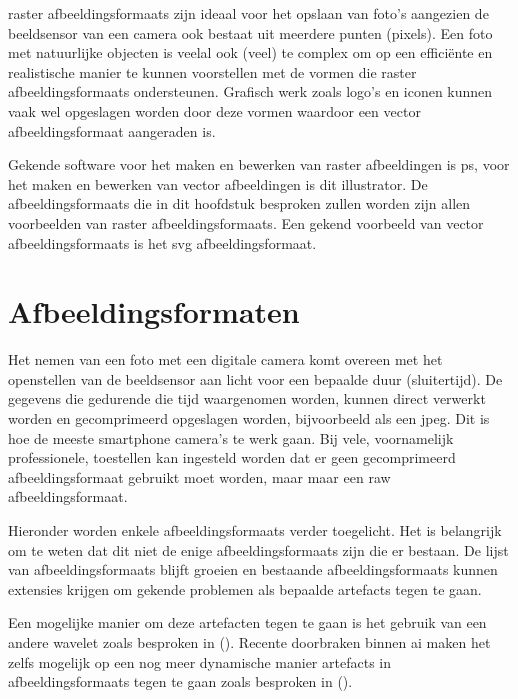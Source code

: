 \Gls{raster} \glspl{afbeeldingsformaat} zijn ideaal voor het opslaan van foto's aangezien de beeldsensor van een camera ook bestaat uit meerdere punten (pixels). Een foto met natuurlijke objecten is veelal ook (veel) te complex om op een efficiënte en realistische manier te kunnen voorstellen met de vormen die \gls{raster} \glspl{afbeeldingsformaat}  ondersteunen. Grafisch werk zoals logo's en iconen kunnen vaak wel opgeslagen worden door deze vormen waardoor een \gls{vector} \gls{afbeeldingsformaat} aangeraden is.

Gekende software voor het maken en bewerken van \gls{raster} afbeeldingen is \gls{ps}, voor het maken en bewerken van \gls{vector} afbeeldingen is dit \gls{illustrator}. De \glspl{afbeeldingsformaat} die in dit hoofdstuk besproken zullen worden zijn allen voorbeelden van \gls{raster} \glspl{afbeeldingsformaat}. Een gekend voorbeeld van \gls{vector} \glspl{afbeeldingsformaat} is het \gls{svg} \gls{afbeeldingsformaat}.

\section{Afbeeldingsformaten}
\label{sec:afbeeldingscompressie-afbeeldingsformaten}

Het nemen van een foto met een digitale camera komt overeen met het openstellen van de beeldsensor aan licht voor een bepaalde duur (sluitertijd). De gegevens die gedurende die tijd waargenomen worden, kunnen direct verwerkt worden en gecomprimeerd opgeslagen worden, bijvoorbeeld als een \gls{jpeg}. Dit is hoe de meeste smartphone camera’s te werk gaan. Bij vele, voornamelijk professionele, toestellen kan ingesteld worden dat er geen gecomprimeerd \gls{afbeeldingsformaat} gebruikt moet worden, maar maar een \gls{raw} \gls{afbeeldingsformaat}. 

Hieronder worden enkele \glspl{afbeeldingsformaat} verder toegelicht. Het is belangrijk om te weten dat dit niet de enige \glspl{afbeeldingsformaat} zijn die er bestaan. De lijst van \glspl{afbeeldingsformaat} blijft groeien en bestaande \glspl{afbeeldingsformaat} kunnen extensies krijgen om gekende problemen als bepaalde \glspl{artefact} tegen te gaan. 

Een mogelijke manier om deze artefacten tegen te gaan is het gebruik van een andere \gls{wavelet} zoals besproken in  (\cite{inproceedings}). Recente doorbraken binnen \gls{ai} maken het zelfs mogelijk op een nog meer dynamische manier \glspl{artefact} in \glspl{afbeeldingsformaat} tegen te gaan zoals besproken in  (\cite{jpegartefactereductionai}).



